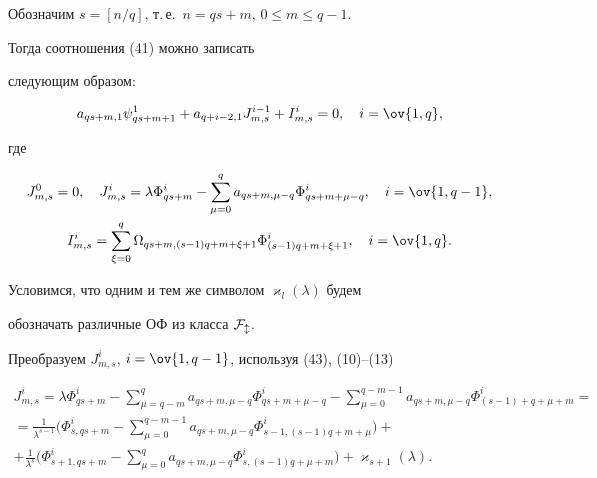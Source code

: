 Обозначим $s=[n/q]$, т.\,е.~$n=qs+m$, $0\le m\le q-1$. 


Тогда соотношения (41) можно записать 


следующим образом: 


\begin{equation} 


a_{qs+m,1}\psi^1_{qs+m+1}+a_{q+i-2,1}J^{i-1}_{m,s}+ 


I^i_{m,s}=0,\quad i=\ov{1,q}, 


\end{equation} 


где 


\begin{gather} 


J^0_{m,s}=0,\quad J^i_{m,s}=\lambda\Phi^i_{qs+m}- 


\sum^q_{\mu=0}a_{qs+m,\mu-q}\Phi^i_{qs+m+\mu-q},\quad i=\ov{1,q-1},\\ 


I^i_{m,s}=\sum^q_{\xi=0}\Omega_{qs+m,(s-1)q+m+\xi+1} 


\Phi^i_{(s-1)q+m+\xi+1},\quad i=\ov{1,q}. 


\end{gather} 


Условимся, что одним и тем же символом $\varkappa_l(\lambda)$ будем 


обозначать различные ОФ из класса $\cal F_l$. 


 


Преобразуем $J^i_{m,s}$, $i=\ov{1,q-1}$, используя (43), (10)--(13) 


\begin{multline*} 


J^i_{m,s}=\lambda\Phi^i_{qs+m}-\sum^q_{\mu=q-m} 


a_{qs+m,\mu-q}\Phi^i_{qs+m+\mu-q}-\sum^{q-m-1}_{\mu=0} 


a_{qs+m,\mu-q}\Phi^i_{(s-1)+q+\mu+m}= \\ 


=\frac{1}{\lambda^{s-1}}\bigg(\Phi^i_{s,qs+m}- 


\sum^{q-m-1}_{\mu=0}a_{qs+m,\mu-q}\Phi^i_{s-1,(s-1)q+m+\mu}\bigg)+\\ 


+\frac{1}{\lambda^s}\bigg(\Phi^i_{s+1,qs+m}-\sum^q_{\mu=0} 


a_{qs+m,\mu-q}\Phi^i_{s,(s-1)q+\mu+m}\bigg)+\varkappa_{s+1}(\lambda). 


\end{multline*} 


